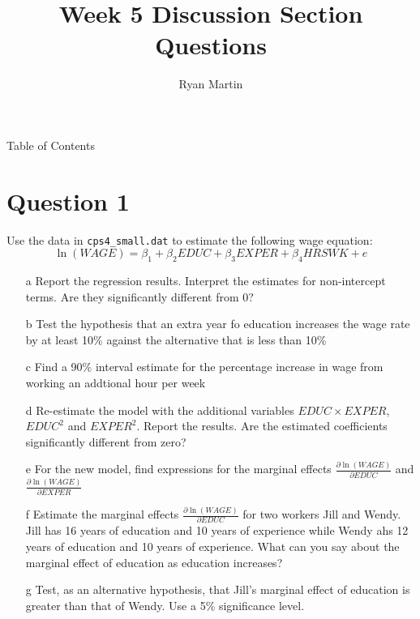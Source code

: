 \documentclass[xcolor={dvipsnames}]{beamer}
\title{ Week 5 Discussion Section Questions }
\author{Ryan Martin}
\begin{document}
	\maketitle


	\begin{frame}{Table of Contents}
		\tableofcontents
	\end{frame}

	\section{Question 1}
	
\begin{frame}[allowframebreaks]{5.19}
	Use the data in \texttt{cps4\_small.dat} to estimate the following wage equation:	$$\ln(WAGE) = \beta_1 + \beta_2 EDUC + \beta_3 EXPER + \beta_4 HRSWK  + e$$
	
	
	
	\begin{itemize}
		\item[a] Report the regression results. Interpret the estimates for non-intercept terms. Are they significantly different from 0?


	\item[b] Test the hypothesis that an extra year fo education increases the wage rate by at least 10\% against the alternative that is less than 10\%
	
	\item[c] Find a 90\% interval estimate for the percentage increase in wage from working an addtional hour per week
	
	\item[d] Re-estimate the model with the additional variables $EDUC \times EXPER$, $EDUC^2$ and $EXPER^2$. Report the results. Are the estimated coefficients significantly different from zero?

	
	\item[e] For the new model, find expressions for the marginal effects $\frac{\partial \ln (WAGE)}{ \partial EDUC}$ and $\frac{\partial \ln (WAGE)}{ \partial EXPER}$
	
		\item[f] Estimate the marginal effects $\frac{\partial \ln (WAGE)}{ \partial EDUC}$ for two workers Jill and Wendy. Jill has 16 years of education and 10 years of experience while Wendy ahs 12 years of education and 10 years of experience. What can you say about the marginal effect of education as education increases?
		
	\item[g] Test, as an alternative hypothesis, that Jill's marginal effect of education is greater than that of Wendy. Use a 5\% significance level.


\end{itemize}
\end{frame}
\end{document}
